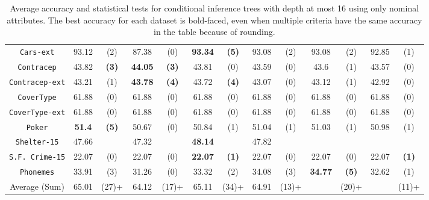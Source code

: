 \begin{table}
\begin{tabular}{c|cc|cc|cc|cc|cc|cc}
{\tt Cars-ext}      & 93.12      &  (2)              &   87.38      & (0)             & {\bf 93.34} &  {\bf (5)}           & 93.08       & (2)             & 93.08       & (2)         & 92.85       & (1)         \\
{\tt Contracep}     & 43.82      &  {\bf (3)}        &   {\bf 44.05}& {\bf (3)}       &  43.81      &  (0)                 & 43.59       & (0)             & 43.6        & (1)         & 43.57       & (0)         \\
{\tt Contracep-ext} & 43.21      &  (1)              &   {\bf 43.78}& {\bf (4)}       &  43.72      &  {\bf (4)}           & 43.07       & (0)             & 43.12       & (1)         & 42.92       & (0)         \\
{\tt CoverType}     & 61.88      &  (0)              &   61.88      & (0)             &  61.88      &  (0)                 & 61.88       & (0)             & 61.88       & (0)         & 61.88       & (0)         \\
{\tt CoverType-ext} & 61.88      &  (0)              &   61.88      & (0)             &  61.88      &  (0)                 & 61.88       & (0)             & 61.88       & (0)         & 61.88       & (0)         \\
{\tt Poker}         & {\bf 51.4} &  {\bf (5)}        &   50.67      & (0)             &  50.84      &  (1)                 & 51.04       & (1)             & 51.03       & (1)         & 50.98       & (1)         \\
{\tt Shelter-15}    & 47.66      &                   &   47.32      &                 & {\bf 48.14} &                      & 47.82       &                 &             &             &             &             \\
{\tt S.F. Crime-15} & 22.07      &  (0)              &   22.07      & (0)             & {\bf 22.07} &  {\bf (1)}           & 22.07       & (0)             & 22.07       & (0)         & 22.07       & {\bf (1)}   \\
{\tt Phonemes}      & 33.91      &  (3)              &   31.26      & (0)             &  33.32      &  (2)                 & 34.08       & (3)             & {\bf 34.77} & {\bf (5)}   & 32.62       & (1)         \\
\hline
Average (Sum)       & 65.01      &  (27)+            &   64.12      & (17)+           &  65.11      &  (34)+               & 64.91       & (13)+           &             & (20)+       &             & (11)+
       \end{tabular}
        \caption{Average accuracy and statistical tests  for  conditional inference trees 
with depth at most 16 using only nominal attributes. The best accuracy for each dataset is bold-faced, even when multiple criteria have the same accuracy in the table because of rounding.}
\label{tab:ctree-16}
\normalsize
\end{table}


